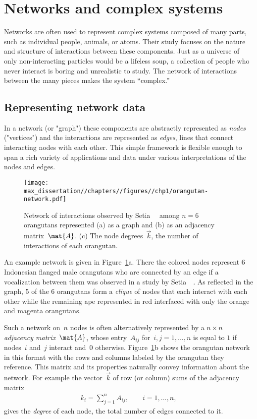 \section{Networks and complex systems}
\label{sec:networks}

Networks are often used to represent complex systems composed of many parts, such as individual people, animals, or atoms. Their study focuses on the nature and structure of interactions between these components. Just as a universe of only non-interacting particles would be a lifeless soup, a collection of people who never interact is boring and unrealistic to study. The network of interactions between the many pieces makes the system “complex.” 

\subsection{Representing network data}

In a network (or "graph") these components are abstractly represented as \emph{nodes} ("vertices") and the interactions are represented as \emph{edges}, lines that connect interacting nodes with each other. This simple framework is flexible enough to span a rich variety of applications and data under various interpretations of the nodes and edges.

\begin{figure}
    \centering
    \texttt{[image: max\_dissertation//chapters//figures//chp1/orangutan-network.pdf]}
    \caption{Network of interactions observed by Setia~\etal~\cite{SV07} among $n = 6$ orangutans represented (a) as a graph and (b) as an adjacency matrix~$\mat{A}$. (c) The node degrees~$\vec{k}$, the number of interactions of each orangutan.}
    \label{fig:orangutan-network}
\end{figure}

An example network is given in Figure~\ref{fig:orangutan-network}a. There the colored nodes represent 6 Indonesian flanged male orangutans who are connected by an edge if a vocalization between them was observed in a study by Setia~\etal~\cite{SV07}. As reflected in the graph, 5 of the 6 orangutans form a \emph{clique} of nodes that each interact with each other while the remaining ape represented in red interfaced with only the orange and magenta orangutans. 

Such a network on~$n$ nodes is often alternatively represented by a $n \times n$ \emph{adjacency matrix}~$\mat{A}$, whose entry~$A_{ij}$ for~$i,j = 1,...,n$ is equal to $1$ if nodes~$i$ and~$j$ interact and~$0$ otherwise. Figure~\ref{fig:orangutan-network}b shows the orangutan network in this format with the rows and columns labeled by the orangutan they reference. This matrix and its properties naturally convey information about the network. For example the vector~$\vec{k}$ of row (or column) sums of the adjacency matrix \begin{align}
    k_i = \sum_{j=1}^n A_{ij}, \qquad i = 1,...,n,
\end{align}
gives the \emph{degree} of each node, the total number of edges connected to it.

